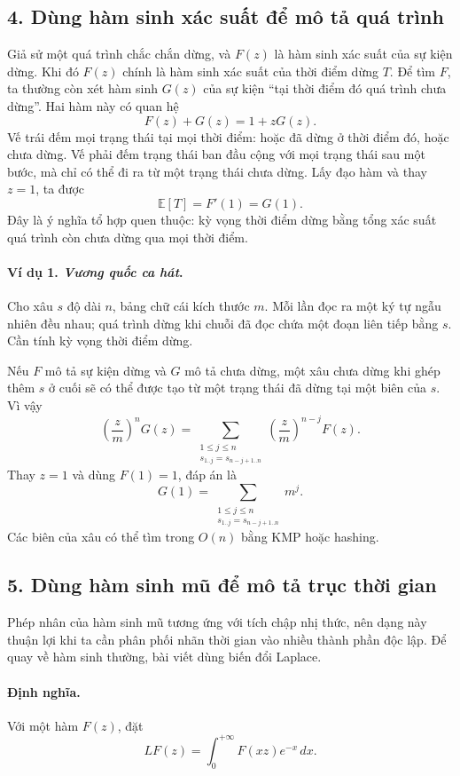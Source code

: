\documentclass[11pt]{article}
\begin{document}
\subsection*{4. Dùng hàm sinh xác suất để mô tả quá trình}

Giả sử một quá trình chắc chắn dừng, và \(F(z)\) là hàm sinh xác suất của sự
kiện dừng. Khi đó \(F(z)\) chính là hàm sinh xác suất của thời điểm dừng
\(T\). Để tìm \(F\), ta thường còn xét hàm sinh \(G(z)\) của sự kiện ``tại thời
điểm đó quá trình chưa dừng''. Hai hàm này có quan hệ
\[
  F(z)+G(z)=1+zG(z).
\]
Vế trái đếm mọi trạng thái tại mọi thời điểm: hoặc đã dừng ở thời điểm đó, hoặc
chưa dừng. Vế phải đếm trạng thái ban đầu cộng với mọi trạng thái sau một bước,
mà chỉ có thể đi ra từ một trạng thái chưa dừng. Lấy đạo hàm và thay \(z=1\),
ta được
\[
  \mathbb E[T]=F'(1)=G(1).
\]
Đây là ý nghĩa tổ hợp quen thuộc: kỳ vọng thời điểm dừng bằng tổng xác suất quá
trình còn chưa dừng qua mọi thời điểm.

\paragraph{Ví dụ 1. \emph{Vương quốc ca hát}.}
Cho xâu \(s\) độ dài \(n\), bảng chữ cái kích thước \(m\). Mỗi lần đọc ra một
ký tự ngẫu nhiên đều nhau; quá trình dừng khi chuỗi đã đọc chứa một đoạn liên
tiếp bằng \(s\). Cần tính kỳ vọng thời điểm dừng.

Nếu \(F\) mô tả sự kiện dừng và \(G\) mô tả chưa dừng, một xâu chưa dừng khi
ghép thêm \(s\) ở cuối sẽ có thể được tạo từ một trạng thái đã dừng tại một
biên của \(s\). Vì vậy
\[
  \left(\frac zm\right)^nG(z)=
  \sum_{\substack{1\le j\le n\\s_{1..j}=s_{n-j+1..n}}}
  \left(\frac zm\right)^{n-j}F(z).
\]
Thay \(z=1\) và dùng \(F(1)=1\), đáp án là
\[
  G(1)=
  \sum_{\substack{1\le j\le n\\s_{1..j}=s_{n-j+1..n}}}m^j.
\]
Các biên của xâu có thể tìm trong \(O(n)\) bằng KMP hoặc hashing.

\subsection*{5. Dùng hàm sinh mũ để mô tả trục thời gian}

Phép nhân của hàm sinh mũ tương ứng với tích chập nhị thức, nên dạng này thuận
lợi khi ta cần phân phối nhãn thời gian vào nhiều thành phần độc lập. Để quay
về hàm sinh thường, bài viết dùng biến đổi Laplace.

\paragraph{Định nghĩa.}
Với một hàm \(F(z)\), đặt
\[
  L F(z)=\int_0^{+\infty}F(xz)e^{-x}\,dx.
\]
\end{document}
